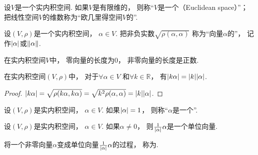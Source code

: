 \begin{definition}
设\(V\)是一个实内积空间.
如果\(V\)是有限维的，
则称“\(V\)是一个（Euclidean space）”；
把线性空间\(V\)的维数称为“欧几里得空间\(V\)的”.
\end{definition}

\begin{definition}
设\((V,\rho)\)是一个实内积空间，
\(\alpha \in V\).
把非负实数\(\sqrt{\rho(\alpha,\alpha)}\)
称为“向量\(\alpha\)的”，
记作\(\abs{\alpha}\)或\(\norm{\alpha}\).
\end{definition}

\begin{property}\label{theorem:实内积空间.向量的长度具有非负性}
在实内积空间\(V\)中，
零向量的长度为\(0\)，
非零向量的长度是正数.
\end{property}

\begin{property}\label{theorem:实内积空间.向量的长度具有齐次性}
在实内积空间\((V,\rho)\)中，
对于\(\forall \alpha \in V\)
和\(\forall k \in \mathbb{R}\)，
有\(\abs{k\alpha} = \abs{k} \abs{\alpha}\).
\begin{proof}
\(\abs{k\alpha}
= \sqrt{\rho(k\alpha,k\alpha)}
= \sqrt{k^2\rho(\alpha,\alpha)}
= \abs{k} \abs{\alpha}\).
\end{proof}
\end{property}

\begin{definition}
设\((V,\rho)\)是实内积空间，
\(\alpha \in V\).
如果\(\abs{\alpha} = 1\)，
则称“\(\alpha\)是一个”.
\end{definition}

\begin{property}
设\((V,\rho)\)是实内积空间，
\(\alpha \in V\).
如果\(\alpha\neq0\)，
则\(\frac1{\abs{\alpha}} \alpha\)是一个单位向量.
\end{property}
\begin{remark}
将一个非零向量\(\alpha\)变成单位向量\(\frac1{\abs{\alpha}} \alpha\)的过程，
称为.
\end{remark}

